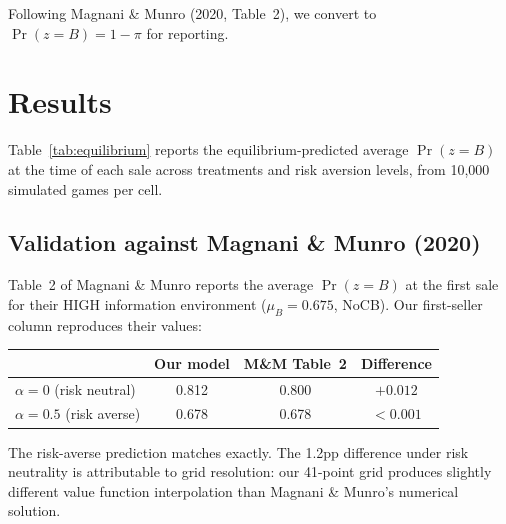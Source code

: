 \documentclass[11pt]{article}
\begin{document}
Following Magnani \& Munro (2020, Table~2), we convert to $\Pr(z = B) =
1 - \pi$ for reporting.

\section{Results}

Table~\ref{tab:equilibrium} reports the equilibrium-predicted average
$\Pr(z = B)$ at the time of each sale across treatments and risk aversion
levels, from 10{,}000 simulated games per cell.

\begin{table}[h]
\centering
\small

\caption{Equilibrium predictions: average $\Pr(z = B)$ at each seller
position. The 4th investor never sells ($n = 1$ boundary condition).}
\label{tab:equilibrium}
\end{table}

\subsection{Validation against Magnani \& Munro (2020)}

Table~2 of Magnani \& Munro reports the average $\Pr(z = B)$ at the first sale
for their HIGH information environment ($\mu_B = 0.675$, NoCB). Our
first-seller column reproduces their values:

\begin{center}
\small
\begin{tabular}{lccc}
\toprule
 & Our model & M\&M Table~2 & Difference \\
\midrule
$\alpha = 0$ (risk neutral) & 0.812 & 0.800 & $+0.012$ \\
$\alpha = 0.5$ (risk averse) & 0.678 & 0.678 & $< 0.001$ \\
\bottomrule
\end{tabular}
\end{center}

The risk-averse prediction matches exactly. The 1.2pp difference under risk
neutrality is attributable to grid resolution: our 41-point grid produces
slightly different value function interpolation than Magnani \& Munro's
numerical solution.
\end{document}
